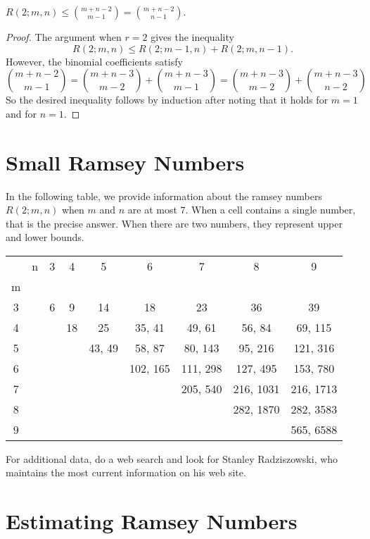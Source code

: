 \begin{corollary}
$R(2;m,n)\le \binom{m+n-2}{m-1}=\binom{m+n-2}{n-1}$.
\end{corollary}

\begin{proof}
The argument when $r=2$ gives the inequality
\[
R(2;m,n)\le R(2;m-1,n)+R(2;m,n-1).
\]
However, the binomial coefficients satisfy
\[
\binom{m+n-2}{m-1}=\binom{m+n-3}{m-2}+\binom{m+n-3}{m-1} =
\binom{m+n-3}{m-2}+\binom{m+n-3}{n-2}
\]
So the desired inequality follows by induction after noting
that it holds for $m=1$ and for $n=1$.
\end{proof} 

\section{Small Ramsey Numbers}\label{s:size}

In the following table, we provide information about
the ramsey numbers $R(2;m,n)$ when $m$ and $n$ are at
most $7$.   When a cell contains a single number, that
is the precise answer.  When there are two numbers, they
represent upper and lower bounds.

\begin{center}
\begin{tabular}{||cc||c|c|c|c|c|c|c||}
\hline\hline
&n&3&4&5&6&7&8&9\\
m&&&&&&&&\\
\hline\hline
3&&6&9&14&18&23&36&39\\
4&&&18&25&35, 41&49, 61&56, 84&69, 115\\
5&&&&43, 49&58, 87&80, 143&95, 216&121, 316\\
6&&&&&102, 165&111, 298&127, 495&153, 780\\
7&&&&&&205, 540&216, 1031&216, 1713\\
8&&&&&&&282, 1870&282, 3583\\
9&&&&&&&&565, 6588\\
\hline\hline
\end{tabular}
\end{center}

For additional data, do a web search and look for
Stanley Radziszowski, who maintains the most current information
on his web site.

\section{Estimating Ramsey Numbers}\label{s:estimatesize}

